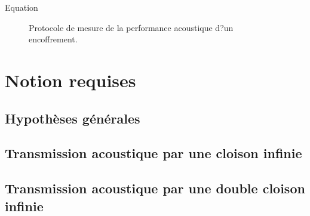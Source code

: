 \documentclass[12pt,foolscap]{report}
\begin{document}
Equation
 
 

\begin{figure}
	\centering
	\caption{ Protocole de mesure de la performance acoustique d?un encoffrement.
	}
	\label{meas}
\end{figure}
\chapter{Notion requises}
\section{Hypothèses générales}
\section{Transmission acoustique par une cloison infinie}
\section{Transmission acoustique par une double cloison infinie}
\end{document}

